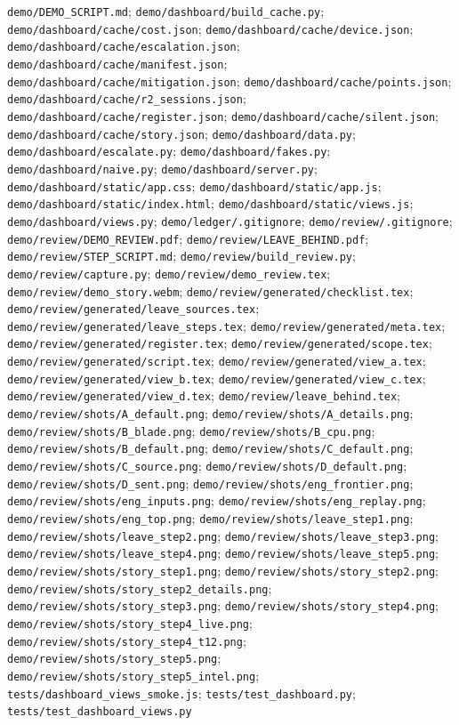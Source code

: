 {\footnotesize\raggedright \texttt{demo/DEMO\_SCRIPT.md}; \texttt{demo/dashboard/build\_cache.py}; \texttt{demo/dashboard/cache/cost.json}; \texttt{demo/dashboard/cache/device.json}; \texttt{demo/dashboard/cache/escalation.json}; \texttt{demo/dashboard/cache/manifest.json}; \texttt{demo/dashboard/cache/mitigation.json}; \texttt{demo/dashboard/cache/points.json}; \texttt{demo/dashboard/cache/r2\_sessions.json}; \texttt{demo/dashboard/cache/register.json}; \texttt{demo/dashboard/cache/silent.json}; \texttt{demo/dashboard/cache/story.json}; \texttt{demo/dashboard/data.py}; \texttt{demo/dashboard/escalate.py}; \texttt{demo/dashboard/fakes.py}; \texttt{demo/dashboard/naive.py}; \texttt{demo/dashboard/server.py}; \texttt{demo/dashboard/static/app.css}; \texttt{demo/dashboard/static/app.js}; \texttt{demo/dashboard/static/index.html}; \texttt{demo/dashboard/static/views.js}; \texttt{demo/dashboard/views.py}; \texttt{demo/ledger/.gitignore}; \texttt{demo/review/.gitignore}; \texttt{demo/review/DEMO\_REVIEW.pdf}; \texttt{demo/review/LEAVE\_BEHIND.pdf}; \texttt{demo/review/STEP\_SCRIPT.md}; \texttt{demo/review/build\_review.py}; \texttt{demo/review/capture.py}; \texttt{demo/review/demo\_review.tex}; \texttt{demo/review/demo\_story.webm}; \texttt{demo/review/generated/checklist.tex}; \texttt{demo/review/generated/leave\_sources.tex}; \texttt{demo/review/generated/leave\_steps.tex}; \texttt{demo/review/generated/meta.tex}; \texttt{demo/review/generated/register.tex}; \texttt{demo/review/generated/scope.tex}; \texttt{demo/review/generated/script.tex}; \texttt{demo/review/generated/view\_a.tex}; \texttt{demo/review/generated/view\_b.tex}; \texttt{demo/review/generated/view\_c.tex}; \texttt{demo/review/generated/view\_d.tex}; \texttt{demo/review/leave\_behind.tex}; \texttt{demo/review/shots/A\_default.png}; \texttt{demo/review/shots/A\_details.png}; \texttt{demo/review/shots/B\_blade.png}; \texttt{demo/review/shots/B\_cpu.png}; \texttt{demo/review/shots/B\_default.png}; \texttt{demo/review/shots/C\_default.png}; \texttt{demo/review/shots/C\_source.png}; \texttt{demo/review/shots/D\_default.png}; \texttt{demo/review/shots/D\_sent.png}; \texttt{demo/review/shots/eng\_frontier.png}; \texttt{demo/review/shots/eng\_inputs.png}; \texttt{demo/review/shots/eng\_replay.png}; \texttt{demo/review/shots/eng\_top.png}; \texttt{demo/review/shots/leave\_step1.png}; \texttt{demo/review/shots/leave\_step2.png}; \texttt{demo/review/shots/leave\_step3.png}; \texttt{demo/review/shots/leave\_step4.png}; \texttt{demo/review/shots/leave\_step5.png}; \texttt{demo/review/shots/story\_step1.png}; \texttt{demo/review/shots/story\_step2.png}; \texttt{demo/review/shots/story\_step2\_details.png}; \texttt{demo/review/shots/story\_step3.png}; \texttt{demo/review/shots/story\_step4.png}; \texttt{demo/review/shots/story\_step4\_live.png}; \texttt{demo/review/shots/story\_step4\_t12.png}; \texttt{demo/review/shots/story\_step5.png}; \texttt{demo/review/shots/story\_step5\_intel.png}; \texttt{tests/dashboard\_views\_smoke.js}; \texttt{tests/test\_dashboard.py}; \texttt{tests/test\_dashboard\_views.py}\par}

